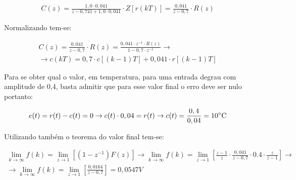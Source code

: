 \documentclass[a4paper,12pt]{article}
\begin{document}
			\begin{equation}
				\left.
				\begin{array}{c}
					\displaystyle C(z) = \frac{1,0 \cdot 0,041}{z - 0,741 + 1,0 \cdot 0,041} \cdot Z\left[r(kT)\right] = \frac{0,041}{z - 0,7} \cdot R(z)
				\end{array}
				\right.
				\quad 
			\end{equation}
			
			Normalizando tem-se:
			
			\begin{equation}
				\left.
				\begin{array}{c}
					\displaystyle C(z) = \frac{0,041}{z - 0,7} \cdot R(z) = \frac{0,041 \cdot z^{-1} \cdot R(z)}{1 - 0,7 \cdot z^{-1}}  \rightarrow \\[20pt]
					\rightarrow \displaystyle c(kT) = 0,7\cdot c[(k-1)T] + 0,041 \cdot r[(k-1)T]
				\end{array}
				\right.
				\quad 
			\end{equation}
			
			Para se obter qual o valor, em temperatura, para uma entrada degrau com amplitude de 0,4, basta admitir que para esse valor final o erro deve ser nulo portanto:
			
			\begin{equation}
				\left.
				\begin{array}{c}
					\displaystyle e(t)= r(t) - c(t) = 0 \rightarrow c(t) \cdot 0,04 = r(t) \rightarrow c(t) = \frac{0,4}{0,04} = 10 \celsius
				\end{array}
				\right.
				\quad 
			\end{equation}
			
			Utilizando também o teorema do valor final tem-se:
			
			\begin{equation}
				\left.
				\begin{array}{c}
					\displaystyle \lim_{k \to \infty}f(k) = \lim_{z \to 1}\left[(1-z^{-1})F(z) \right] \rightarrow \lim_{k \to \infty}f(k) = \lim_{z \to 1}\left[ \frac{z-1}{z} \cdot \frac{0,041}{z - 0,7} \cdot 0.4 \cdot \frac{z}{z-1}  \right] \rightarrow \\[20pt]
					
					\displaystyle \rightarrow \lim_{k \to \infty}f(k) =  \lim_{z \to 1}\left[  \frac{0,0164}{z - 0,7}  \right] = 0,0547 V
				\end{array}
				\right.
				\quad 
			\end{equation}
			
\end{document}
